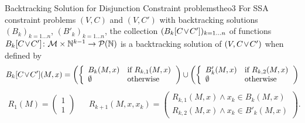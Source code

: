 \begin{theorem}{Backtracking Solution for Disjunction Constraint problems}{theo3}
    For SSA constraint problems $(V,C)$ and $(V,C')$ with backtracking
    solutions $(B_k)_{k=1\dots n}$, $(B'_k)_{k=1\dots n}$, the collection
    $(B_k[C\hspace{-0.5mm}\lor\hspace{-0.5mm}C'])_{k=1\dots n}$ of functions
    \mbox{$B_k[C\hspace{-0.5mm}\lor\hspace{-0.5mm}C']\colon\mathcal M\times\mathbb N^{k-1}\rightarrow\mathcal P(\mathbb N)$}
    is a backtracking solution of
    $(V,C\hspace{-0.5mm}\lor\hspace{-0.5mm}C')$ when defined by
    \begin{align*}
        B_k[C\hspace{-0.5mm}\lor\hspace{-0.5mm}C'](M,x)=\left(\left\{
            \begin{array}{ll}
                B_k(M,x)&\text{if }R_{k,1}(M,x)\\
                \emptyset&\text{otherwise}
            \end{array}\right.
            \right)\cup\left(\left\{
            \begin{array}{ll}
                B'_k(M,x)&\text{if }R_{k,2}(M,x)\\
                \emptyset&\text{otherwise}
            \end{array}\right.
            \right)
    \end{align*}
    \vspace{-0.2cm}
    \begin{align*}
        R_1(M)=\left(\begin{array}{l}1\\1\end{array}\right)&&
        R_{k+1}(M,x,x_k)=\left(
            \begin{array}{l}
                R_{k,1}(M,x)\mathrel\land x_k\in B_k(M,x)\\
                R_{k,2}(M,x)\mathrel\land x_k\in B'_k(M,x)
            \end{array}\right).
    \end{align*}
    \tcblower

\end{theorem}
